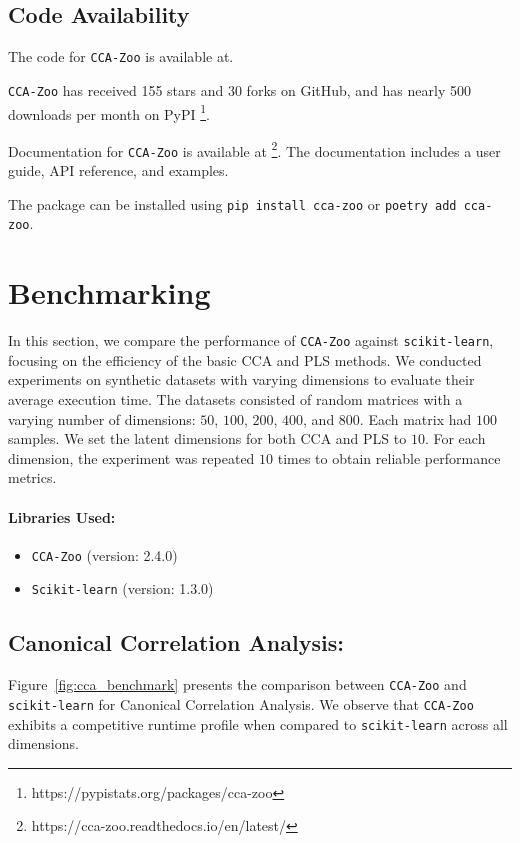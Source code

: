 \subsection{Code Availability}

The code for \texttt{CCA-Zoo} is available at.

\texttt{CCA-Zoo} has received 155 stars and 30 forks on GitHub, and has nearly 500 downloads per month on PyPI \footnote{https://pypistats.org/packages/cca-zoo}.

Documentation for \texttt{CCA-Zoo} is available at \footnote{https://cca-zoo.readthedocs.io/en/latest/}.
The documentation includes a user guide, API reference, and examples.

The package can be installed using \texttt{pip install cca-zoo} or \texttt{poetry add cca-zoo}.



\section{Benchmarking}

In this section, we compare the performance of \texttt{CCA-Zoo} against \texttt{scikit-learn}, focusing on the efficiency of the basic CCA and PLS methods.
We conducted experiments on synthetic datasets with varying dimensions to evaluate their average execution time.
The datasets consisted of random matrices with a varying number of dimensions: \(50\), \(100\), \(200\), \(400\), and \(800\). Each matrix had \(100\) samples. We set the latent dimensions for both CCA and PLS to \(10\).
    For each dimension, the experiment was repeated \(10\) times to obtain reliable performance metrics.

\paragraph{Libraries Used:}
\begin{itemize}
    \item \texttt{CCA-Zoo} (version: 2.4.0)
    \item \texttt{Scikit-learn} (version: 1.3.0)
\end{itemize}

\subsection{Canonical Correlation Analysis:}
Figure~\ref{fig:cca_benchmark} presents the comparison between \texttt{CCA-Zoo} and \texttt{scikit-learn} for Canonical Correlation Analysis. We observe that \texttt{CCA-Zoo} exhibits a competitive runtime profile when compared to \texttt{scikit-learn} across all dimensions.


